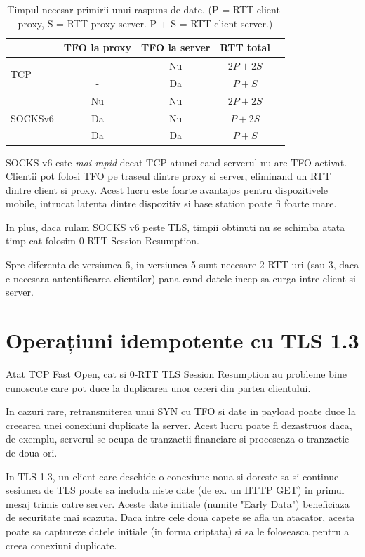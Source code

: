 \begin{table}
	\centering
	\begin{tabular}{| l | c | c | c | r |} \hline
		& TFO la proxy & TFO la server & RTT total \\ \hline
		\multirow{2}{*}{TCP} & - & Nu  & \(2P+2S\) \\ \hhline{~----}
		~ & - & Da  & \(P+S\) \\ \hline
		\multirow{3}{*}{SOCKSv6} & Nu & Nu  & \(2P + 2S\)  \\ \hhline{~----}
		~ & Da & Nu & \(P + 2S\) \\ \hhline{~----}
		~ & Da  & Da & \(P + S\) \\ \hline
	\end{tabular}
  	\caption{Timpul necesar primirii unui raspuns de date. (P = RTT client-proxy, S = RTT proxy-server. P + S = RTT client-server.)}
 \end{table}

SOCKS v6 este \emph{mai rapid} decat TCP atunci cand serverul nu are TFO activat.
Clientii pot folosi TFO pe traseul dintre proxy si server, eliminand un RTT dintre client si proxy.
Acest lucru este foarte avantajos pentru dispozitivele mobile, intrucat latenta dintre dispozitiv si base station
poate fi foarte mare.

In plus, daca rulam SOCKS v6 peste TLS, timpii obtinuti nu se schimba atata timp cat folosim 0-RTT Session Resumption.

Spre diferenta de versiunea 6, in versiunea 5 sunt necesare 2 RTT-uri (sau 3, daca e necesara autentificarea clientilor)
pana cand datele incep sa curga intre client si server.

\section{Operațiuni idempotente cu TLS 1.3}

Atat TCP Fast Open, cat si 0-RTT TLS Session Resumption au probleme bine cunoscute care pot duce la duplicarea unor
cereri din partea clientului.

In cazuri rare, retransmiterea unui SYN cu TFO si date in payload poate duce la creearea unei conexiuni duplicate la server.
Acest lucru poate fi dezastruos daca, de exemplu, serverul se ocupa de tranzactii financiare si proceseaza o tranzactie de doua ori.

In TLS 1.3, un client care deschide o conexiune noua si doreste sa-si continue sesiunea de TLS poate sa includa niste date (de ex. un HTTP GET)
in primul mesaj trimis catre server. Aceste date initiale (numite "Early Data") beneficiaza de securitate mai scazuta.
Daca intre cele doua capete se afla un atacator, acesta poate sa captureze datele initiale (in forma criptata) si sa le foloseasca pentru a creea conexiuni duplicate.

